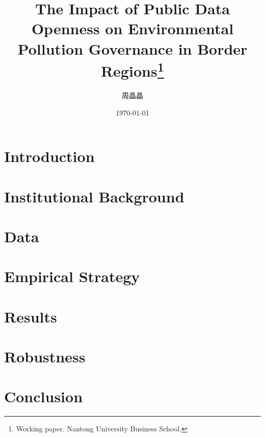 \documentclass[11pt,a4paper]{article}
\title{The Impact of Public Data Openness on Environmental Pollution Governance in Border Regions\thanks{Working paper. Nantong University Business School.}}
\author{周晶晶}
\date{\today}
\begin{document}
\maketitle

\begin{abstract}
\end{abstract}

\section{Introduction}\label{sec:intro}

\section{Institutional Background}\label{sec:background}

\section{Data}\label{sec:data}

\section{Empirical Strategy}\label{sec:strategy}

\section{Results}\label{sec:results}

\section{Robustness}\label{sec:robust}

\section{Conclusion}\label{sec:conclusion}

\end{document}

